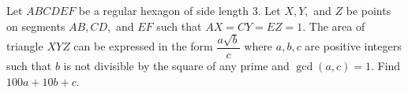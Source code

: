 Let $ABCDEF$ be a regular hexagon of side length $3$. Let $X, Y,$ and $Z$ be points on segments $AB, CD,$ and $EF$ such that $AX=CY=EZ=1$. The area of triangle $XYZ$ can be expressed in the form $\dfrac{a\sqrt b}{c}$ where $a,b,c$ are positive integers such that $b$ is not divisible by the square of any prime and $\gcd(a,c)=1$. Find $100a+10b+c$.
